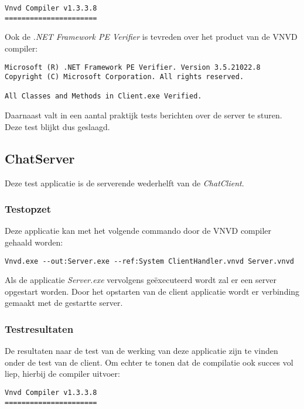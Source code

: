 \begin{lstlisting}
Vnvd Compiler v1.3.3.8
======================

\end{lstlisting}

Ook de \textit{.NET Framework PE Verifier} is tevreden over het product van de VNVD compiler:

\begin{lstlisting}
Microsoft (R) .NET Framework PE Verifier. Version 3.5.21022.8
Copyright (C) Microsoft Corporation. All rights reserved.

All Classes and Methods in Client.exe Verified.
\end{lstlisting}

Daarnaast valt in een aantal praktijk tests berichten over de server te sturen. Deze test blijkt dus geslaagd.

\subsection{ChatServer}
Deze test applicatie is de serverende wederhelft van de \textit{ChatClient}.

\subsubsection{Testopzet}
Deze applicatie kan met het volgende commando door de VNVD compiler gehaald worden:

\begin{lstlisting}
Vnvd.exe --out:Server.exe --ref:System ClientHandler.vnvd Server.vnvd
\end{lstlisting}

Als de applicatie \textit{Server.exe} vervolgens ge\"executeerd wordt zal er een server opgestart worden. Door het opstarten van de client applicatie wordt er verbinding gemaakt met de gestartte server.

\subsubsection{Testresultaten}
De resultaten naar de test van de werking van deze applicatie zijn te vinden onder de test van de client. Om echter te tonen dat de compilatie ook succes vol liep, hierbij de compiler uitvoer:

\begin{lstlisting}
Vnvd Compiler v1.3.3.8
======================

\end{lstlisting}

